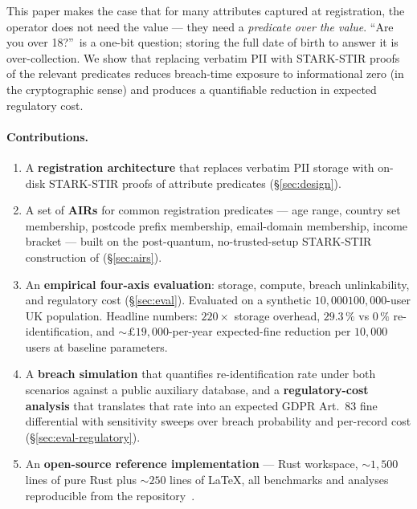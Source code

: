 \documentclass[11pt,a4paper]{article}
\begin{document}
This paper makes the case that for many attributes captured at
registration, the operator does not need the value — they need a
\emph{predicate over the value}.  ``Are you over 18?''~is a one-bit
question; storing the full date of birth to answer it is
over\nobreakdash-collection.  We show that replacing verbatim PII with
STARK\nobreakdash-STIR proofs of the relevant predicates
\cite{stark-stir,stir,starks} reduces breach\nobreakdash-time exposure
to informational zero (in the cryptographic sense) and produces a
quantifiable reduction in expected regulatory cost.

\paragraph{Contributions.}

\begin{enumerate}
  \item A \textbf{registration architecture} that replaces verbatim
        PII storage with on\nobreakdash-disk STARK\nobreakdash-STIR
        proofs of attribute predicates (\S\ref{sec:design}).
  \item A set of \textbf{AIRs} for common registration predicates —
        age range, country set membership, postcode prefix membership,
        email\nobreakdash-domain membership, income bracket — built on
        the post\nobreakdash-quantum, no\nobreakdash-trusted\nobreakdash-setup
        STARK\nobreakdash-STIR construction of
        \cite{stark-stir} (\S\ref{sec:airs}).
  \item An \textbf{empirical four\nobreakdash-axis evaluation}:
        storage, compute, breach unlinkability, and regulatory cost
        (\S\ref{sec:eval}).  Evaluated on a synthetic
        $10{,}000$\textendash$100{,}000$\nobreakdash-user UK
        population.  Headline numbers: $220\!\times$ storage
        overhead, $29.3\,\%$ vs $0\,\%$ re\nobreakdash-identification,
        and $\sim\!\pounds 19{,}000$\nobreakdash-per\nobreakdash-year
        expected\nobreakdash-fine reduction per $10{,}000$ users at
        baseline parameters.
  \item A \textbf{breach simulation} that quantifies
        re\nobreakdash-identification rate under both scenarios against
        a public auxiliary database, and a
        \textbf{regulatory\nobreakdash-cost analysis} that translates
        that rate into an expected GDPR Art.~83 fine differential
        with sensitivity sweeps over breach probability and per\nobreakdash-record
        cost (\S\ref{sec:eval-regulatory}).
  \item An \textbf{open\nobreakdash-source reference implementation} —
        Rust workspace, $\sim\!1{,}500$ lines of pure Rust plus
        $\sim\!250$ lines of LaTeX, all benchmarks and analyses
        reproducible from the
        repository~\cite{mmiyc-impl}.
\end{enumerate}
\end{document}
